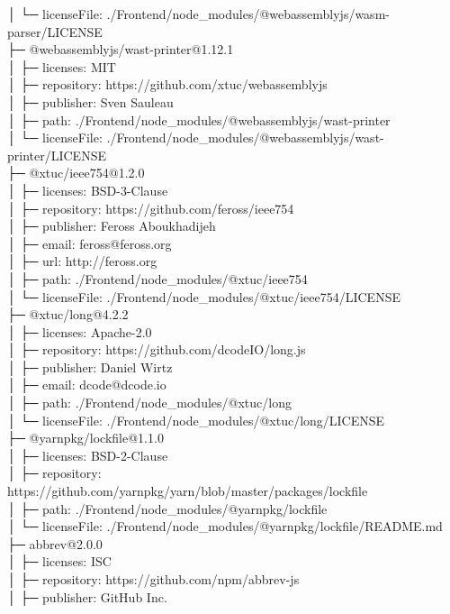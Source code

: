 │  └─ licenseFile: ./Frontend/node\_modules/@webassemblyjs/wasm-parser/LICENSE\\
├─ @webassemblyjs/wast-printer@1.12.1\\
│  ├─ licenses: MIT\\
│  ├─ repository: https://github.com/xtuc/webassemblyjs\\
│  ├─ publisher: Sven Sauleau\\
│  ├─ path: ./Frontend/node\_modules/@webassemblyjs/wast-printer\\
│  └─ licenseFile: ./Frontend/node\_modules/@webassemblyjs/wast-printer/LICENSE\\
├─ @xtuc/ieee754@1.2.0\\
│  ├─ licenses: BSD-3-Clause\\
│  ├─ repository: https://github.com/feross/ieee754\\
│  ├─ publisher: Feross Aboukhadijeh\\
│  ├─ email: feross@feross.org\\
│  ├─ url: http://feross.org\\
│  ├─ path: ./Frontend/node\_modules/@xtuc/ieee754\\
│  └─ licenseFile: ./Frontend/node\_modules/@xtuc/ieee754/LICENSE\\
├─ @xtuc/long@4.2.2\\
│  ├─ licenses: Apache-2.0\\
│  ├─ repository: https://github.com/dcodeIO/long.js\\
│  ├─ publisher: Daniel Wirtz\\
│  ├─ email: dcode@dcode.io\\
│  ├─ path: ./Frontend/node\_modules/@xtuc/long\\
│  └─ licenseFile: ./Frontend/node\_modules/@xtuc/long/LICENSE\\
├─ @yarnpkg/lockfile@1.1.0\\
│  ├─ licenses: BSD-2-Clause\\
│  ├─ repository: https://github.com/yarnpkg/yarn/blob/master/packages/lockfile\\
│  ├─ path: ./Frontend/node\_modules/@yarnpkg/lockfile\\
│  └─ licenseFile: ./Frontend/node\_modules/@yarnpkg/lockfile/README.md\\
├─ abbrev@2.0.0\\
│  ├─ licenses: ISC\\
│  ├─ repository: https://github.com/npm/abbrev-js\\
│  ├─ publisher: GitHub Inc.\\
